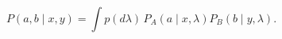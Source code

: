 \setcounter{equation}{44}
\begin{equation}
P(a,b\mid x,y)=\int p(d\lambda)\,P_A(a\mid x,\lambda)P_B(b\mid y,\lambda).
\end{equation}
